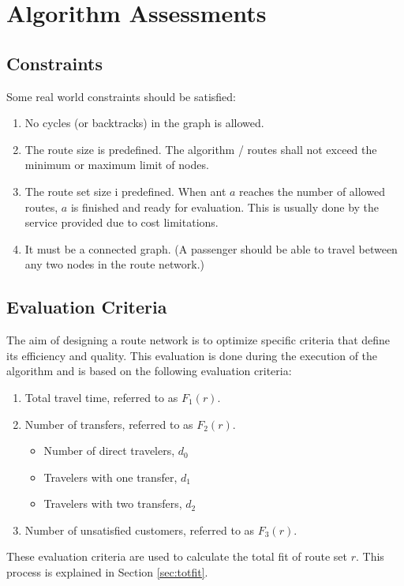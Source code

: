 \section{Algorithm Assessments}

\subsection{Constraints}
Some real world constraints should be satisfied:
\begin{enumerate}
\item \label{itm:constraintCycles} No cycles (or backtracks) in the graph is allowed.
\item \label{itm:constraintRouteSize} The route size is predefined. The algorithm / routes shall not exceed the minimum or maximum limit of nodes.
\item \label{itm:constraintRouteSetSize} The route set size i predefined. When ant $a$ reaches the number of allowed routes, $a$ is finished and ready for evaluation. This is usually done by the service provided due to cost limitations.
\item \label{itm:criteriaConnectedGraph} It must be a connected graph. (A passenger should be able to travel between any two nodes in the route network.) 
\end{enumerate}

\subsection{Evaluation Criteria} 
The aim of designing a route network is to optimize specific criteria that define its efficiency and quality. This evaluation is done during the execution of the algorithm and is based on the following evaluation criteria:
\begin{enumerate}
\item \label{itm:criteriaTotalTravelTime} Total travel time, referred to as $F_1(r)$.
\item \label{itm:f2} Number of transfers, referred to as $F_2(r)$.
\begin{itemize}
\item Number of direct travelers, $d_0$
\item Travelers with one transfer, $d_1$
\item Travelers with two transfers, $d_2$
\end{itemize}
\item Number of unsatisfied customers, referred to as $F_3(r)$. 
\end{enumerate}
These evaluation criteria are used to calculate the total fit of route set $r$. This process is explained in Section \vref{sec:totfit}.



